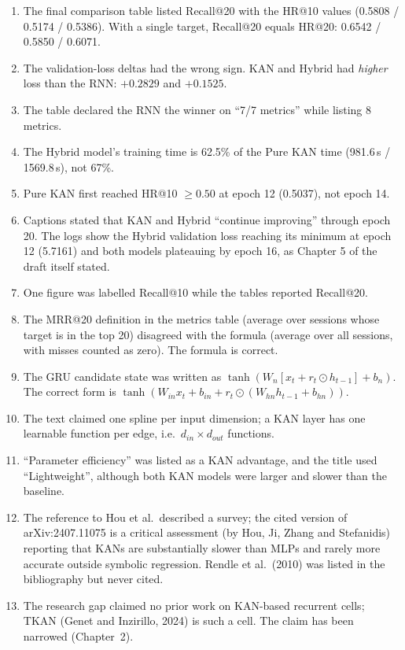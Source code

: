 \begin{enumerate}[leftmargin=*]
  \item The final comparison table listed Recall@20 with the HR@10 values
        (0.5808 / 0.5174 / 0.5386). With a single target, Recall@20 equals
        HR@20: 0.6542 / 0.5850 / 0.6071.
  \item The validation-loss deltas had the wrong sign. KAN and Hybrid had
        \emph{higher} loss than the RNN: $+0.2829$ and $+0.1525$.
  \item The table declared the RNN the winner on ``7/7 metrics'' while listing
        8 metrics.
  \item The Hybrid model's training time is 62.5\% of the Pure KAN time
        (981.6\,s / 1569.8\,s), not 67\%.
  \item Pure KAN first reached HR@10 $\geq 0.50$ at epoch 12 (0.5037), not
        epoch 14.
  \item Captions stated that KAN and Hybrid ``continue improving'' through
        epoch 20. The logs show the Hybrid validation loss reaching its minimum
        at epoch 12 (5.7161) and both models plateauing by epoch 16, as
        Chapter 5 of the draft itself stated.
  \item One figure was labelled Recall@10 while the tables reported Recall@20.
  \item The MRR@20 definition in the metrics table (average over sessions whose
        target is in the top 20) disagreed with the formula (average over all
        sessions, with misses counted as zero). The formula is correct.
  \item The GRU candidate state was written as
        $\tanh(W_n[x_t + r_t\odot h_{t-1}] + b_n)$. The correct form is
        $\tanh(W_{in}x_t + b_{in} + r_t\odot(W_{hn}h_{t-1} + b_{hn}))$.
  \item The text claimed one spline per input dimension; a KAN layer has one
        learnable function per edge, i.e.\ $d_{in}\times d_{out}$ functions.
  \item ``Parameter efficiency'' was listed as a KAN advantage, and the title
        used ``Lightweight'', although both KAN models were larger and slower
        than the baseline.
  \item The reference to Hou et al.\ described a survey; the cited version of
        arXiv:2407.11075 is a critical assessment (by Hou, Ji, Zhang and
        Stefanidis) reporting that KANs are substantially slower than MLPs and
        rarely more accurate outside symbolic regression. Rendle et al.\ (2010)
        was listed in the bibliography but never cited.
  \item The research gap claimed no prior work on KAN-based recurrent cells;
        TKAN (Genet and Inzirillo, 2024) is such a cell. The claim has been
        narrowed (Chapter~2).
\end{enumerate}
